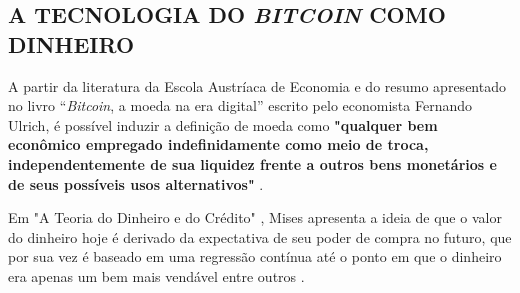 \documentclass[article,12pt,oneside,a4paper,english,brazil]{unifil}
\begin{document}
\begin{Spacing}{1.5}



\section*{A TECNOLOGIA DO \textit{BITCOIN} COMO DINHEIRO} \label{sec:dinheiro}
A partir da literatura da Escola Austríaca de Economia e do resumo apresentado no livro ``\textit{Bitcoin}, a moeda na era digital'' escrito pelo economista Fernando Ulrich, é possível induzir a definição de moeda como \textbf{"qualquer bem econômico empregado indefinidamente como meio de troca, independentemente de sua liquidez frente a outros bens monetários e de seus possíveis usos alternativos"} \cite[P.89]{Ulrich2014}. 

Em "A Teoria do Dinheiro e do Crédito" \cite{von2013theory}, Mises apresenta a ideia de que o valor do dinheiro hoje é derivado da expectativa de seu poder de compra no futuro, que por sua vez é baseado em uma regressão contínua até o ponto em que o dinheiro era apenas um bem mais vendável entre outros \cite{von2013theory}. 


\end{Spacing}
\end{document}
